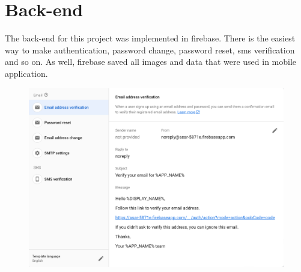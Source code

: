 \section{Back-end}
\hspace{7mm}The back-end for this project was implemented in firebase. There is the easiest way to make authentication, password change, password reset, sms verification and so on. As well, firebase saved all images and data that were used in mobile application.
\begin{figure}[H]
    \centering
    \includegraphics[scale=0.51]{images/back1.png}
\end{figure}
